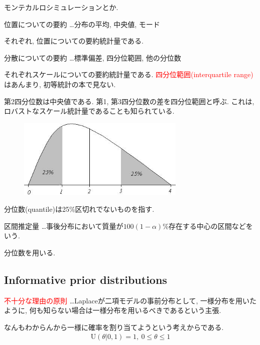 \documentclass[11pt,a4pape,dvipdfmx]{jarticle}
\newcommand{\eqn}[1]{\begin{align*}#1\end{align*}}
\newcommand{\tcr}[1]{\textcolor{red}{#1}}
\begin{document}
モンテカルロシミュレーションとか.


\begin{itembox}[l]{位置についての要約}
…分布の平均, 中央値, モード
\end{itembox}

それぞれ, 位置についての要約統計量である.


\begin{itembox}[l]{分散についての要約}
…標準偏差, 四分位範囲, 他の分位数
\end{itembox}

それぞれスケールについての要約統計量である.
\tcr{四分位範囲(interquartile range)}はあんまり, 初等統計の本で見ない.

第2四分位数は中央値である.
第1, 第3四分位数の差を四分位範囲と呼ぶ.
これは, ロバストなスケール統計量であることも知られている.
\begin{figure}[H]
\begin{center}
\includegraphics[clip, width=8cm]{../2/code/quantile.jpg}
\end{center}
\end{figure}

分位数(quantile)は25\%区切れでないものを指す.

\begin{itembox}[l]{区間推定量}
…事後分布において質量が$100(1-\alpha)\%$存在する中心の区間などをいう.
\end{itembox}

分位数を用いる.


\subsection{Informative prior distributions}
\begin{itembox}[l]{\tcr{不十分な理由の原則}}
…Laplaceが二項モデルの事前分布として, 一様分布を用いたように, 何も知らない場合は一様分布を用いるべきであるという主張.
\end{itembox}

なんもわからんから一様に確率を割り当てようという考えからである.
\eqn{\text{U}(\theta|0,1)=1,\ 0\leq \theta\leq 1}
\end{document}
